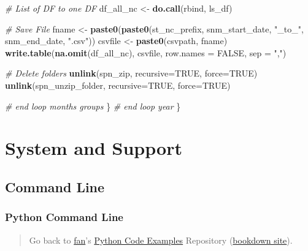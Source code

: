 \documentclass[
]{book}
\newenvironment{Shaded}{\begin{snugshade}}{\end{snugshade}}
\newcommand{\CommentTok}[1]{\textcolor[rgb]{0.56,0.35,0.01}{\textit{#1}}}
\newcommand{\DataTypeTok}[1]{\textcolor[rgb]{0.13,0.29,0.53}{#1}}
\newcommand{\KeywordTok}[1]{\textcolor[rgb]{0.13,0.29,0.53}{\textbf{#1}}}
\newcommand{\NormalTok}[1]{#1}
\newcommand{\OtherTok}[1]{\textcolor[rgb]{0.56,0.35,0.01}{#1}}
\newcommand{\StringTok}[1]{\textcolor[rgb]{0.31,0.60,0.02}{#1}}
\begin{document}
\begin{Shaded}
\begin{Highlighting}[]
    \CommentTok{\# List of DF to one DF}
\NormalTok{    df\_all\_nc \textless{}{-}}\StringTok{ }\KeywordTok{do.call}\NormalTok{(rbind, ls\_df)}

    \CommentTok{\# Save File}
\NormalTok{    fname \textless{}{-}}\StringTok{ }\KeywordTok{paste0}\NormalTok{(}\KeywordTok{paste0}\NormalTok{(st\_nc\_prefix,}
\NormalTok{                           snm\_start\_date, }\StringTok{"\_to\_"}\NormalTok{, snm\_end\_date,}
                           \StringTok{".csv"}\NormalTok{))}
\NormalTok{    csvfile \textless{}{-}}\StringTok{ }\KeywordTok{paste0}\NormalTok{(csvpath, fname)}
    \KeywordTok{write.table}\NormalTok{(}\KeywordTok{na.omit}\NormalTok{(df\_all\_nc), csvfile, }\DataTypeTok{row.names =} \OtherTok{FALSE}\NormalTok{, }\DataTypeTok{sep =} \StringTok{","}\NormalTok{)}

    \CommentTok{\# Delete folders}
    \KeywordTok{unlink}\NormalTok{(spn\_zip, }\DataTypeTok{recursive=}\OtherTok{TRUE}\NormalTok{, }\DataTypeTok{force=}\OtherTok{TRUE}\NormalTok{)}
    \KeywordTok{unlink}\NormalTok{(spn\_unzip\_folder, }\DataTypeTok{recursive=}\OtherTok{TRUE}\NormalTok{, }\DataTypeTok{force=}\OtherTok{TRUE}\NormalTok{)}

  \CommentTok{\# end loop months groups}
\NormalTok{  \}}
\CommentTok{\# end loop year}
\NormalTok{\}}
\end{Highlighting}
\end{Shaded}

\hypertarget{system-and-support}{%
\chapter{System and Support}\label{system-and-support}}

\hypertarget{command-line}{%
\section{Command Line}\label{command-line}}

\hypertarget{python-command-line}{%
\subsection{Python Command Line}\label{python-command-line}}

\begin{quote}
Go back to \href{http://fanwangecon.github.io/}{fan}'s \href{https://fanwangecon.github.io/pyfan/}{Python Code Examples} Repository (\href{https://fanwangecon.github.io/pyfan/bookdown}{bookdown site}).
\end{quote}
\end{document}
